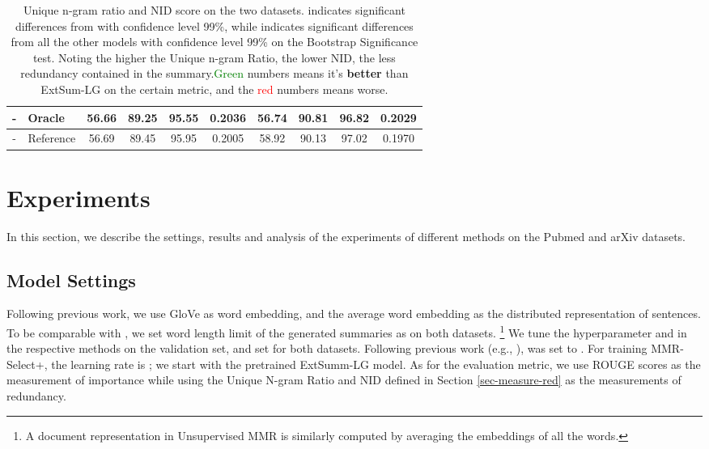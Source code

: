 \documentclass[11pt,a4paper]{article}
\begin{document}
\begin{table*}[h!]
{\begin{tabular}{c|l|c|c|c|c|c|c|c|c}
        \hline
-&        Oracle &56.66 &89.25 & 95.55&0.2036& 56.74 &90.81 & 96.82&0.2029\\
        \hline
-&        Reference&56.69 & 89.45&95.95 &0.2005&58.92 & 90.13& 97.02 &0.1970\\
        \hline
    \end{tabular}}
    \caption{Unique n-gram ratio and NID score on the two datasets.  indicates significant differences from \cite{xiao-carenini-2019-extractive} with confidence level 99\%, while  indicates significant differences from all the other models with confidence level 99\% on the Bootstrap Significance test. Noting the higher the Unique n-gram Ratio, the lower NID, the less redundancy contained in the summary.\textcolor{Green}{Green} numbers means it's \textbf{better }than ExtSum-LG on the certain metric, and the \textcolor{Red}{red} numbers means worse.}
    \label{tab:redundancy}
    \vspace{-2mm}
\end{table*}
\vspace{-1mm}
\section{Experiments}
In this section, we describe the settings, results and analysis of the experiments of different methods on the Pubmed and arXiv datasets.
\vspace{-1mm}
\subsection{Model Settings}


Following previous work, we use GloVe \cite{glove} as word embedding, and the average word embedding as the distributed representation of sentences. To be comparable with \citet{xiao-carenini-2019-extractive}, we set word length limit of the generated summaries as  on both datasets.  \footnote{A document representation in Unsupervised MMR is similarly computed by averaging the embeddings of all the words.}
We tune the hyperparameter  and  in the respective methods on the validation set, and set  for both datasets. Following previous work (e.g., \citet{bertrl}),  was set to . For training MMR-Select+, the learning rate is ; we start with the pretrained ExtSumm-LG model. As for the evaluation metric, we use ROUGE scores as the measurement of importance while using the Unique N-gram Ratio and NID defined in Section \ref{sec-measure-red} as the measurements of redundancy.
\vspace{-1mm}
\end{document}
